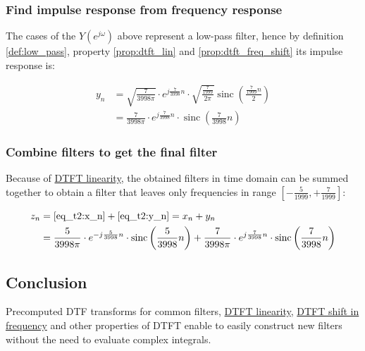 \documentclass[a4paper]{article}
\theoremstyle{break}
\theoremstyle{break}
\DeclareMathOperator{\sinc}{sinc}
\begin{document}
\subsubsection*{Find impulse response from frequency response}

The cases of the $Y(e^{j \omega})$ above represent a low-pass filter, hence by definition \ref{def:low_pass}, property \ref{prop:dtft_lin} and \ref{prop:dtft_freq_shift} its impulse response is:

\begin{equation} \label{eq_t2:y_n}
  \begin{split}
    y_n &= \sqrt{\frac{7}{3998 \pi}} \cdot e^{j \frac{7}{3998} n} \cdot \sqrt{\frac{\frac{7}{1999}}{2 \pi}} \sinc \left( \frac{\frac{7}{1999} n} {2} \right) \\
        &= \frac{7}{3998 \pi} \cdot e^{j \frac{7}{3998} n} \cdot \sinc \left( \frac{7}{3998} n \right)
  \end{split}
\end{equation}

\subsubsection*{Combine filters to get the final filter}

Because of \hyperref[prop:dtft_lin]{DTFT linearity}, the obtained filters in time domain can be summed together to obtain a filter that leaves only frequencies in range $\left[ -\frac{5}{1999}, + \frac{7}{1999} \right]$:

\begin{equation*}
  \begin{split}
    z_n &= \eqref{eq_t2:x_n} + \eqref{eq_t2:y_n} = x_n + y_n \\
        &= \frac{5}{3998 \pi} \cdot e^{-j \frac{5}{3998} n} \cdot \sinc \left( \frac{5}{3998} n \right) + \frac{7}{3998 \pi} \cdot e^{j \frac{7}{3998} n} \cdot \sinc \left( \frac{7}{3998} n \right)
  \end{split}
\end{equation*}

\subsection*{Conclusion}

Precomputed DTF transforms for common filters, \hyperref[prop:dtft_lin]{DTFT linearity}, \hyperref[prop:dtft_freq_shift]{DTFT shift in frequency} and other properties of DTFT enable to easily construct new filters without the need to evaluate complex integrals.
\end{document}
